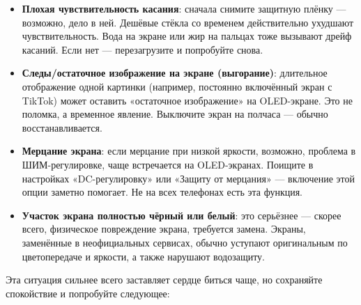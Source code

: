 
\begin{itemize}
  \item \textbf{Плохая чувствительность касания}: сначала снимите защитную плёнку — возможно, дело в ней. Дешёвые стёкла со временем действительно ухудшают чувствительность. Вода на экране или жир на пальцах тоже вызывают дрейф касаний. Если нет — перезагрузите и попробуйте снова.
  \item \textbf{Следы/остаточное изображение на экране (выгорание)}: длительное отображение одной картинки (например, постоянно включённый экран с TikTok) может оставить «остаточное изображение» на OLED-экране. Это не поломка, а временное явление. Выключите экран на полчаса — обычно восстанавливается.
  \item \textbf{Мерцание экрана}: если мерцание при низкой яркости, возможно, проблема в ШИМ-регулировке, чаще встречается на OLED-экранах. Поищите в настройках «DC-регулировку» или «Защиту от мерцания» — включение этой опции заметно помогает. Не на всех телефонах есть эта функция.
  \item \textbf{Участок экрана полностью чёрный или белый}: это серьёзнее — скорее всего, физическое повреждение экрана, требуется замена. Экраны, заменённые в неофициальных сервисах, обычно уступают оригинальным по цветопередаче и яркости, а также нарушают водозащиту.
\end{itemize}


Эта ситуация сильнее всего заставляет сердце биться чаще, но сохраняйте спокойствие и попробуйте следующее:

